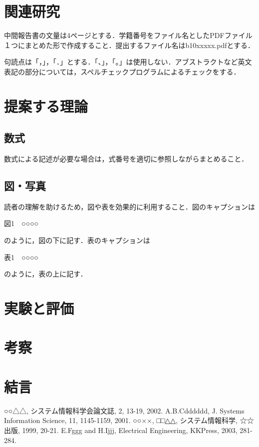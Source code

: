 \documentclass[11pt]{ujarticle} %
\begin{document}
\section{関連研究}

中間報告書の文量は4ページとする．学籍番号をファイル名としたPDFファイル１つにまとめた形で作成すること．提出するファイル名はb10xxxxx.pdfとする．

句読点は「，」，「．」とする．「、」，「。」は使用しない．アブストラクトなど英文表記の部分については，スペルチェックプログラムによるチェックをする．

\section{提案する理論}

\subsection{数式}

数式による記述が必要な場合は，式番号を適切に参照しながらまとめること．

\subsection{図・写真}

読者の理解を助けるため，図や表を効果的に利用すること．図のキャプションは

\begin{center}図1　○○○○\end{center}

のように，図の下に記す．表のキャプションは

\begin{center}表1　○○○○\end{center}

のように，表の上に記す．

\section{実験と評価}

\section{考察}

\section{結言}

\begin{thebibliography}{99}
	○○△△, システム情報科学会論文誌, 2, 13-19, 2002.
	A.B.Cdddddd, J. Systems Information Science, 11, 1145-1159, 2001.
	○○××, □□△△, システム情報科学, ☆☆出版, 1999, 20-21.
	E.Fggg and H.Ijjj, Electrical Engineering, KKPress, 2003, 281-284.
\end{thebibliography}
\end{document}
